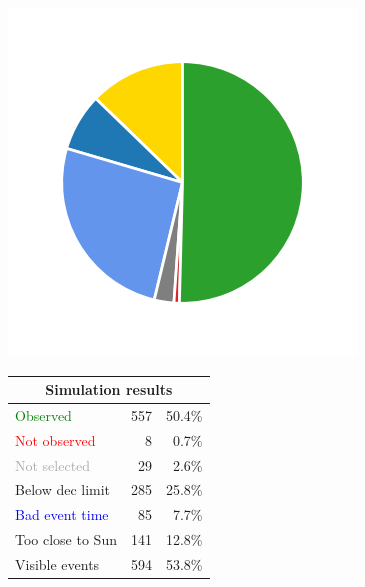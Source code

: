 \begin{colsection}
\begin{colsection}
\begin{figure}[p]
\begin{center}
\begin{minipage}[t]{0.2\textwidth}\vspace{10pt}
\includegraphics[width=\linewidth]{images/gw_sims/2n8_pie.png}
\end{minipage}
%
\begin{minipage}[t]{0.37\textwidth}\vspace{0pt}
\begin{tabular}{lrr}
\multicolumn{3}{c}{\textbf{Simulation results}} \\
\midrule
\textcolor{Green}{Observed} & 557 & 50.4\% \\
\textcolor{Red}{Not observed} & 8 & 0.7\% \\
\textcolor{darkgray}{Not selected} & 29 & 2.6\% \\
\textcolor{NavyBlue}{Below dec limit} & 285 & 25.8\% \\
\textcolor{Blue}{Bad event time} & 85 & 7.7\% \\
\textcolor{BurntOrange}{Too close to Sun} & 141 & 12.8\% \\
\midrule
Visible events & 594 &  53.8\% \\
\end{tabular}
\end{minipage}
%
\begin{minipage}[t]{0.35\textwidth}\vspace{0pt}

\end{minipage}
\end{center}
\end{figure}
\end{colsection}
\end{colsection}
